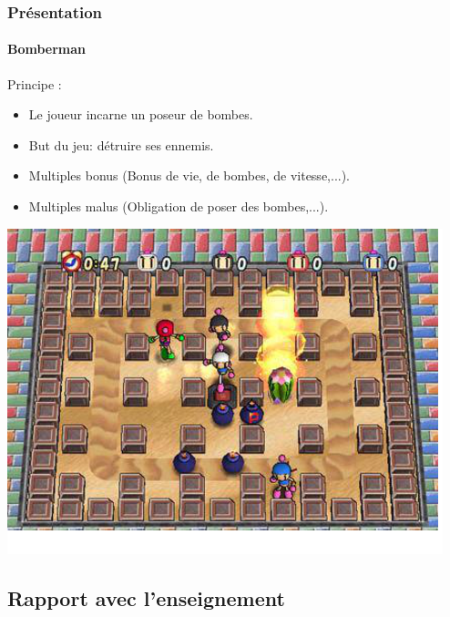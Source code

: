 \begin{frame}
\frametitle{Présentation}
\framesubtitle{Bomberman}
	Principe : \\
	
	\begin{minipage}{5cm}
		\begin{itemize}
			\item Le joueur incarne un poseur de bombes.
			\item But du jeu: détruire ses ennemis.
		\end{itemize}
	\end{minipage}
	\begin{minipage}{5.5cm}
		\begin{itemize}
			\item Multiples bonus (Bonus de vie, de bombes, de vitesse,...).
			\item Multiples malus (Obligation de poser des bombes,...).
		\end{itemize}
	\end{minipage} 
	
	\begin{center}
		\includegraphics[scale=0.35]{img/bomberman2.png}
	\end{center}

\end{frame}


 
\subsection{Rapport avec l'enseignement}


